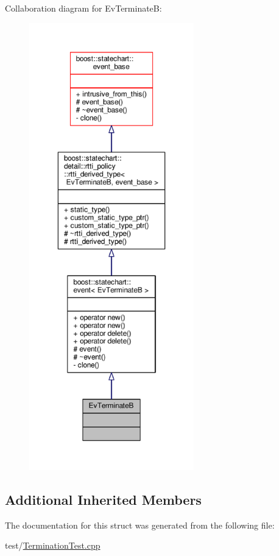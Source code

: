 Collaboration diagram for Ev\+TerminateB\+:
\nopagebreak
\begin{figure}[H]
\begin{center}
\leavevmode
\includegraphics[height=550pt]{struct_ev_terminate_b__coll__graph}
\end{center}
\end{figure}
\subsection*{Additional Inherited Members}


The documentation for this struct was generated from the following file\+:\begin{DoxyCompactItemize}
\item 
test/\mbox{\hyperlink{_termination_test_8cpp}{Termination\+Test.\+cpp}}\end{DoxyCompactItemize}
